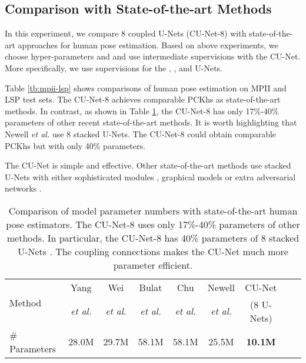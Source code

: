 \documentclass{bmvc2k}
\begin{document}
\subsection{Comparison with State-of-the-art Methods}

In this experiment, we compare 8 coupled U-Nets (CU-Net-8) with state-of-the-art approaches for human pose estimation. Based on above experiments, we choose hyper-parameters  and  and use intermediate supervisions with the CU-Net. More specifically, we use supervisions for the , ,  and  U-Nets.

Table \ref{tb:mpii-lsp} shows comparisons of human pose estimation on MPII and LSP test sets. The  CU-Net-8 achieves comparable PCKhs as state-of-the-art methods. In contrast, as shown in Table \ref{tb:para-num}, the CU-Net-8 has only 17\%-40\% parameters of other recent state-of-the-art methods. It is worth highlighting that Newell {\it et al.} \cite{newell2016stacked} use 8 stacked U-Nets. The CU-Net-8 could obtain comparable PCKhs but with only 40\% parameters.

The CU-Net is simple and effective. Other state-of-the-art methods use stacked U-Nets with either sophisticated modules \cite{yang2017learning}, graphical models \cite{chu2017multi} or extra adversarial networks \cite{yu2017adversarial}.






\begin{table}[t]
\begin{center}
\small
\caption{Comparison of model parameter numbers with state-of-the-art human pose estimators. The CU-Net-8 uses only 17\%-40\% parameters of other methods. In particular, the CU-Net-8 has 40\% parameters of 8 stacked U-Nets \cite{newell2016stacked}. The coupling connections makes the CU-Net much more parameter efficient.}\label{tb:para-num}
\setlength\tabcolsep{3pt}
\begin{tabular}{lcccccccc}
\toprule
\multirow{2}{*}{Method} & Yang  & Wei & Bulat  & Chu & Newell  & CU-Net\\
& {\it et al.}\cite{yang2017learning} & {\it et al.}\cite{wei2016convolutional}  
& {\it et al.}\cite{bulat2016human} & {\it et al.}\cite{chu2017multi} & {\it et al.}\cite{newell2016stacked} & (8 U-Nets)\\
\hline
\# Parameters & 28.0M & 29.7M & 58.1M & 58.1M & 25.5M & {\bf 10.1M}\\
\bottomrule
\end{tabular}
\end{center}
\vspace{-10pt}
\end{table}
\end{document}
